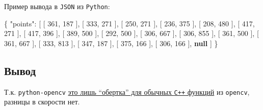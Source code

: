 \documentclass[
  12pt,
  a4paper,
]{article}
\newenvironment{Shaded}{}{}
\newcommand{\DataTypeTok}[1]{\textcolor[rgb]{0.56,0.13,0.00}{#1}}
\newcommand{\DecValTok}[1]{\textcolor[rgb]{0.25,0.63,0.44}{#1}}
\newcommand{\FunctionTok}[1]{\textcolor[rgb]{0.02,0.16,0.49}{#1}}
\newcommand{\KeywordTok}[1]{\textcolor[rgb]{0.00,0.44,0.13}{\textbf{#1}}}
\newcommand{\OtherTok}[1]{\textcolor[rgb]{0.00,0.44,0.13}{#1}}
\begin{document}
Пример вывода в \texttt{JSON} из \texttt{Python}:

\begin{Shaded}
\begin{Highlighting}[]
\FunctionTok{\{}
    \DataTypeTok{"points"}\FunctionTok{:} \OtherTok{[}
        \OtherTok{[}
            \DecValTok{361}\OtherTok{,}
            \DecValTok{187}
        \OtherTok{],}
        \OtherTok{[}
            \DecValTok{333}\OtherTok{,}
            \DecValTok{271}
        \OtherTok{],}
        \OtherTok{[}
            \DecValTok{250}\OtherTok{,}
            \DecValTok{271}
        \OtherTok{],}
        \OtherTok{[}
            \DecValTok{236}\OtherTok{,}
            \DecValTok{375}
        \OtherTok{],}
        \OtherTok{[}
            \DecValTok{208}\OtherTok{,}
            \DecValTok{480}
        \OtherTok{],}
        \OtherTok{[}
            \DecValTok{417}\OtherTok{,}
            \DecValTok{271}
        \OtherTok{],}
        \OtherTok{[}
            \DecValTok{417}\OtherTok{,}
            \DecValTok{396}
        \OtherTok{],}
        \OtherTok{[}
            \DecValTok{389}\OtherTok{,}
            \DecValTok{500}
        \OtherTok{],}
        \OtherTok{[}
            \DecValTok{292}\OtherTok{,}
            \DecValTok{500}
        \OtherTok{],}
        \OtherTok{[}
            \DecValTok{306}\OtherTok{,}
            \DecValTok{667}
        \OtherTok{],}
        \OtherTok{[}
            \DecValTok{306}\OtherTok{,}
            \DecValTok{855}
        \OtherTok{],}
        \OtherTok{[}
            \DecValTok{361}\OtherTok{,}
            \DecValTok{500}
        \OtherTok{],}
        \OtherTok{[}
            \DecValTok{361}\OtherTok{,}
            \DecValTok{667}
        \OtherTok{],}
        \OtherTok{[}
            \DecValTok{333}\OtherTok{,}
            \DecValTok{813}
        \OtherTok{],}
        \OtherTok{[}
            \DecValTok{347}\OtherTok{,}
            \DecValTok{187}
        \OtherTok{],}
        \OtherTok{[}
            \DecValTok{375}\OtherTok{,}
            \DecValTok{166}
        \OtherTok{],}
        \OtherTok{[}
            \DecValTok{306}\OtherTok{,}
            \DecValTok{166}
        \OtherTok{],}
        \KeywordTok{null}
    \OtherTok{]}
\FunctionTok{\}}
\end{Highlighting}
\end{Shaded}

\hypertarget{ux432ux44bux432ux43eux434}{%
\subsection{Вывод}\label{ux432ux44bux432ux43eux434}}

Т.к. \texttt{python-opencv}
\href{https://docs.opencv.org/4.x/da/d49/tutorial_py_bindings_basics.html}{это
лишь ``обертка'' для обычных \texttt{C++} функций} из \texttt{opencv},
разницы в скорости нет.
\end{document}

